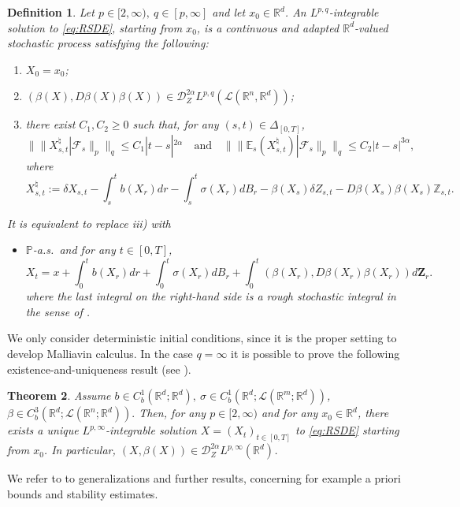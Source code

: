 \documentclass[11pt,a4paper]{article}
\newcommand{\R}{\mathbb{R}}
\newcommand{\E}{\mathbb{E}}
\newtheorem{defn}{Definition}[section]
\theoremstyle{plain}
\newtheorem{thm}[defn]{Theorem}
\begin{document}
\begin{defn} \label{def:solutionRSDEs}
    Let $p\in [2,\infty), \ q \in [p,\infty]$ and let $x_0\in \R^d$. An $L^{p,q}$-integrable solution to \eqref{eq:RSDE}, starting from $x_0$, is a continuous and adapted $\R^d$-valued stochastic process satisfying the following: \begin{enumerate}
    \item[i)] $X_0=x_0$;
    \item[ii)] $(\beta(X),D\beta(X)\beta(X)) \in \mathscr{D}_Z^{2\alpha}L^{p,q}(\mathscr{L}(\R^n,\R^d))$;
    \item[iii)] there exist $C_1,C_2 \ge 0$ such that, for any $(s,t)\in \Delta_{[0,T]}$, \begin{equation*}
            \|\|X^\natural_{s,t}|\mathcal{F}_s\|_p\|_q \le C_1 |t-s|^{2\alpha} \quad \text{and} \quad \|\|\E_s(X^\natural_{s,t})|\mathcal{F}_s\|_p\|_q \le C_2 |t-s|^{3\alpha},
        \end{equation*} where \begin{equation*}
            X^\natural_{s,t} := \delta X_{s,t} - \int_s^tb(X_r)dr -\int_s^t \sigma(X_r)dB_r - \beta(X_s)\delta Z_{s,t} - D\beta(X_s)\beta(X_s)\mathbb{Z}_{s,t}.
        \end{equation*}
    \end{enumerate}
    It is equivalent to replace iii) with \begin{itemize}
    \item[iii')] $\mathbb{P}$-a.s.\ and for any $t\in [0,T]$, \begin{equation*}
        X_t = x +\int_0^tb(X_r)dr + \int_0^t \sigma(X_r)dB_r + \int_0^t (\beta(X_r),D\beta(X_r)\beta(X_r))d\mathbf{Z}_r. 
    \end{equation*}
    where the last integral on the right-hand side is a rough stochastic integral in the sense of \cite[Theorem 3.4]{FHL21}.
\end{itemize}
\end{defn}

We only consider deterministic initial conditions, since it is the proper setting to develop Malliavin calculus. 
In the case $q=\infty$ it is possible to prove the following existence-and-uniqueness result (see \cite[Theorem 4.6]{FHL21}). 
\begin{thm}
    Assume $b\in C^1_b(\R^d;\R^d), \ \sigma\in C^1_b(\R^d;\mathscr{L}(\R^m;\R^d))$, $\beta \in C^3_b(\R^d;\mathscr{L}(\R^n;\R^d)).$ Then, for any $p\in [2,\infty)$ and for any $x_0 \in \R^d$, there exists a unique $L^{p,\infty}$-integrable solution $X=(X_t)_{t\in [0,T]}$ to \eqref{eq:RSDE} starting from $x_0$. In particular, $(X,\beta(X))\in \mathscr{D}_Z^{2\alpha}L^{p,\infty}(\R^d)$.
\end{thm}
We refer to \cite{FHL21} to generalizations and further results, concerning for example a priori bounds and stability estimates.
\end{document}

